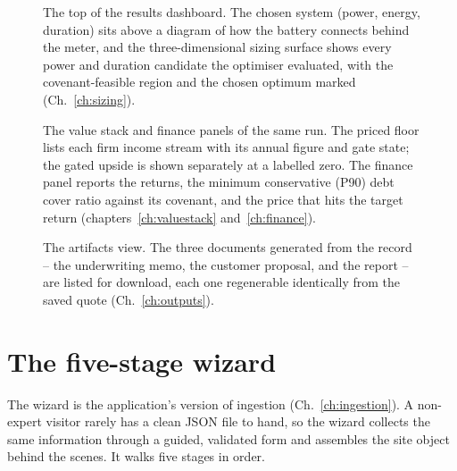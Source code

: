 \begin{figure}[H]
\centering
{}
\caption{The top of the results dashboard. The chosen system (power, energy, duration) sits above a diagram of how the battery connects behind the meter, and the three-dimensional sizing surface shows every power and duration candidate the optimiser evaluated, with the covenant-feasible region and the chosen optimum marked (Ch.~\ref{ch:sizing}).}
\label{fig:app-dashboard-top}
\end{figure}

\begin{figure}[H]
\centering
{}
\caption{The value stack and finance panels of the same run. The priced floor lists each firm income stream with its annual figure and gate state; the gated upside is shown separately at a labelled zero. The finance panel reports the returns, the minimum conservative (P90) debt cover ratio against its covenant, and the price that hits the target return (chapters~\ref{ch:valuestack} and~\ref{ch:finance}).}
\label{fig:app-dashboard-finance}
\end{figure}

\begin{figure}[H]
\centering
{}
\caption{The artifacts view. The three documents generated from the record -- the underwriting memo, the customer proposal, and the report -- are listed for download, each one regenerable identically from the saved quote (Ch.~\ref{ch:outputs}).}
\label{fig:app-artifacts}
\end{figure}

\section{The five-stage wizard}

The wizard is the application's version of ingestion (Ch.~\ref{ch:ingestion}). A non-expert visitor rarely has a clean  JSON file to hand, so the wizard collects the same information through a guided, validated form and assembles the site object behind the scenes. It walks five stages in order.

